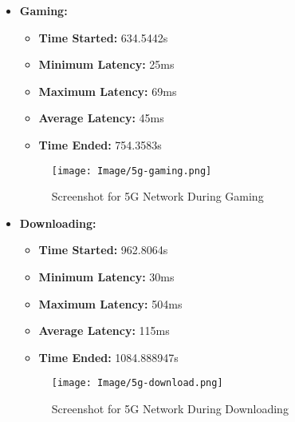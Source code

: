 \documentclass[conference]{IEEEtran}
\begin{document}
\begin{itemize}
    \item \textbf{Gaming:}
    \begin{itemize}
        \item \textbf{Time Started:} 634.5442s
        \item \textbf{Minimum Latency:} 25ms
        \item \textbf{Maximum Latency:} 69ms
        \item \textbf{Average Latency:} 45ms
        \item \textbf{Time Ended:} 754.3583s
    \end{itemize}
    \begin{figure}[h]
        \centering
        \texttt{[image: Image/5g-gaming.png]}
        \caption{Screenshot for 5G Network During Gaming}
        \label{fig:5g_gaming}
    \end{figure}

    \item \textbf{Downloading:}
    \begin{itemize}
        \item \textbf{Time Started:} 962.8064s
        \item \textbf{Minimum Latency:} 30ms
        \item \textbf{Maximum Latency:} 504ms
        \item \textbf{Average Latency:} 115ms
        \item \textbf{Time Ended:} 1084.888947s
    \end{itemize}
    \begin{figure}[h]
        \centering
        \texttt{[image: Image/5g-download.png]}
        \caption{Screenshot for 5G Network During Downloading}
        \label{fig:5g_downloading}
    \end{figure}
\end{itemize}
\end{document}
